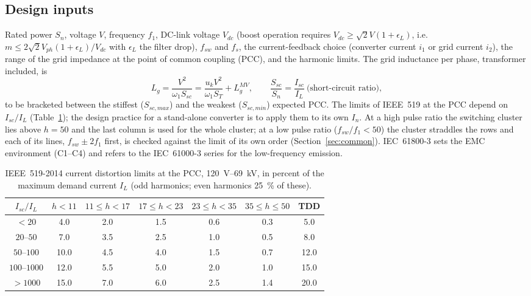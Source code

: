 \documentclass[10pt,a4paper]{scrartcl}
\newcommand{\Vdc}{V_{dc}}
\newcommand{\fsw}{f_{sw}}
\newcommand{\Lg}{L_{g}}
\begin{document}
\begin{onehalfspace}
\subsection{Design inputs}
Rated power $S_n$, voltage $V$, frequency $f_1$, DC-link voltage $\Vdc$ (boost operation requires $\Vdc \ge \sqrt2 V (1 + \epsilon_L)$, i.e.\ $m \le 2\sqrt2 V_{ph}(1+\epsilon_L)/\Vdc$ with $\epsilon_L$ the filter drop), $\fsw$ and $f_s$, the current-feedback choice (converter current $i_1$ or grid current $i_2$), the range of the grid impedance at the point of common coupling (PCC), and the harmonic limits. The grid inductance per phase, transformer included, is
\begin{equation}
\Lg = \frac{V^2}{\omega_1 S_{sc}} = \frac{u_k V^2}{\omega_1 S_T} + \Lg^{MV},\qquad
\frac{S_{sc}}{S_n} = \frac{I_{sc}}{I_L}\ \text{(short-circuit ratio)},
\label{eq:Lg}
\end{equation}
to be bracketed between the stiffest ($S_{sc,max}$) and the weakest ($S_{sc,min}$) expected PCC. The limits of IEEE~519 \cite{ieee519} at the PCC depend on $I_{sc}/I_L$ (Table~\ref{tab:ieee}); the design practice for a stand-alone converter is to apply them to its own $I_n$. At a high pulse ratio the switching cluster lies above $h = 50$ and the last column is used for the whole cluster; at a low pulse ratio ($\fsw/f_1 < 50$) the cluster straddles the rows and each of its lines, $\fsw \pm 2f_1$ first, is checked against the limit of its own order (Section~\ref{sec:common}). IEC~61800-3 \cite{iec61800-3} sets the EMC environment (C1--C4) and refers to the IEC~61000-3 series for the low-frequency emission.
\begin{table}[htb]
\centering\small\begin{onehalfspace}
\caption{IEEE~519-2014 current distortion limits at the PCC, \SI{120}{V}--\SI{69}{kV}, in percent of the maximum demand current $I_L$ (odd harmonics; even harmonics \SI{25}{\percent} of these).}
\label{tab:ieee}
\begin{tabular}{@{}c ccccc c@{}}
\toprule
$I_{sc}/I_L$ & $h < 11$ & $11 \le h < 17$ & $17 \le h < 23$ & $23 \le h < 35$ & $35 \le h \le 50$ & TDD \\
\midrule
$< 20$ & 4.0 & 2.0 & 1.5 & 0.6 & 0.3 & 5.0 \\
$20$--$50$ & 7.0 & 3.5 & 2.5 & 1.0 & 0.5 & 8.0 \\
$50$--$100$ & 10.0 & 4.5 & 4.0 & 1.5 & 0.7 & 12.0 \\
$100$--$1000$ & 12.0 & 5.5 & 5.0 & 2.0 & 1.0 & 15.0 \\
$> 1000$ & 15.0 & 7.0 & 6.0 & 2.5 & 1.4 & 20.0 \\
\bottomrule
\end{tabular}
\end{onehalfspace}
\end{table}


\end{onehalfspace}
\end{document}
